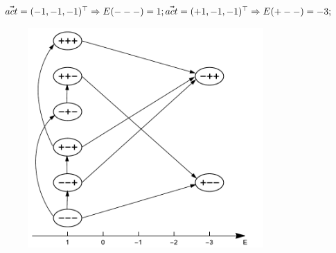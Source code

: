 \documentclass[a4paper,12pt]{article} %
\begin{document}
    $
    \vec{act}=(-1, -1, -1)^\top\Rightarrow E(---)=1;\\
    \vec{act}=(+1, -1, -1)^\top\Rightarrow E(+--)=-3;\\
    $
    \par\bigskip

    \begin{figure}[h]
        \centering
        \includegraphics[width=90mm]{im5.pdf}
    \end{figure}

\newpage

\blindtext
\end{document}

